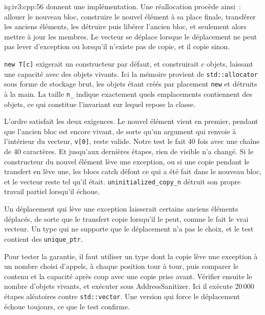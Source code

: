 \begin{solution}{iq:iv3:cpp:56}
 donnent une implémentation. Une réallocation procède ainsi~: allouer le nouveau bloc, construire le nouvel élément à sa place finale, transférer les anciens éléments, les détruire puis libérer l'ancien bloc, et seulement alors mettre à jour les membres. Le vecteur se déplace lorsque le déplacement ne peut pas lever d'exception ou lorsqu'il n'existe pas de copie, et il copie sinon.
\label{lst:iv3:cp:vec1}
\label{lst:iv3:cp:vec2}

\texttt{new T[c]} exigerait un constructeur par défaut, et construirait $c$ objets, laissant une capacité avec des objets vivants. Ici la mémoire provient de \texttt{std::allocator} sous forme de stockage brut, les objets étant créés par placement \texttt{new} et détruits à la main. La taille \texttt{n\_} indique exactement quels emplacements contiennent des objets, ce qui constitue l'invariant sur lequel repose la classe.

L'ordre satisfait les deux exigences. Le nouvel élément vient en premier, pendant que l'ancien bloc est encore vivant, de sorte qu'un argument qui renvoie à l'intérieur du vecteur, \texttt{v[0]}, reste valide. Notre test le fait 40 fois avec une chaîne de 40 caractères. Et jusqu'aux dernières étapes, rien de visible n'a changé. Si le constructeur du nouvel élément lève une exception, ou si une copie pendant le transfert en lève une, les blocs catch défont ce qui a été fait dans le nouveau bloc, et le vecteur reste tel qu'il était. \texttt{uninitialized\_copy\_n} détruit son propre travail partiel lorsqu'il échoue.

Un déplacement qui lève une exception laisserait certains anciens éléments déplacés, de sorte que le transfert copie lorsqu'il le peut, comme le fait le vrai vecteur. Un type qui ne supporte que le déplacement n'a pas le choix, et le test contient des \texttt{unique\_ptr}.

Pour tester la garantie, il faut utiliser un type dont la copie lève une exception à un nombre choisi d'appels, à chaque position tour à tour, puis comparer le contenu et la capacité après coup avec une copie prise avant. Vérifier ensuite le nombre d'objets vivants, et exécuter sous AddressSanitizer. Ici il exécute 20\,000 étapes aléatoires contre \texttt{std::vector}. Une version qui force le déplacement échoue toujours, ce que le test confirme.

\end{solution}

